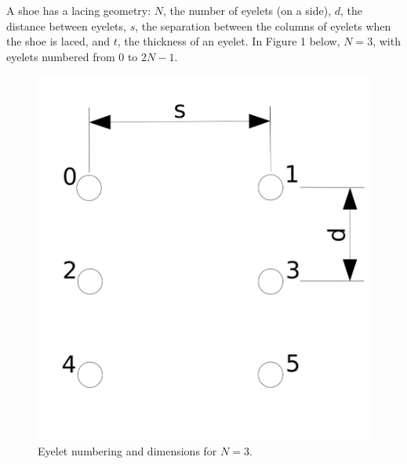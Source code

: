 
A shoe has a lacing geometry: $N$, the number of eyelets (on a side), $d$,
the distance between eyelets, $s$, the separation between the columns of
eyelets when the shoe is laced, and $t$, the thickness of an eyelet.
In Figure 1 below, $N = 3$, with eyelets numbered from $0$ to $2N - 1$.
\begin{figure}[h]
	\begin{center}
		\includegraphics[width=.32\textwidth]{EyeletPattern.png}
	\end{center}
	\caption{Eyelet numbering and dimensions for $N = 3$.}
\end{figure}



